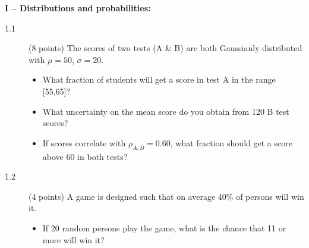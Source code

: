 \documentclass[11pt]{article}
\begin{document}
\vspace{4ex}
\noindent
{\bf I -- Distributions and probabilities:}
\begin{description}
  \item[1.1] (8 points)
  The scores of two tests (A \& B) are both Gaussianly distributed with $\mu=50$, $\sigma=20$.
  \vspace*{-1ex}
  \begin{itemize}
    \item What fraction of students will get a score in test A in the range [55,65]?
    \item What uncertainty on the mean score do you obtain from 120 B test scores?
    \item If scores correlate with $\rho_{A,B} = 0.60$, what fraction should get a score above 60 in both tests?
  \end{itemize}
%
  \item[1.2] (4 points)
  A game is designed such that on average 40\% of persons will win it.
  \vspace*{-1ex}
  \begin{itemize}
    \item If 20 random persons play the game, what is the chance that 11 or more will win it?
  \end{itemize}
\end{description}



\end{document}
